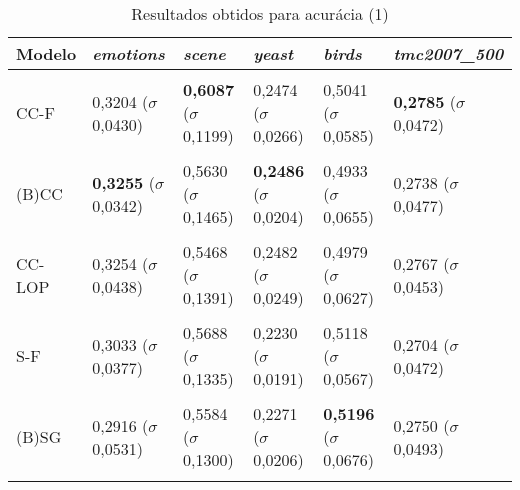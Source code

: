 
\begin{table}[htbp]
	\centering
	\caption{Resultados obtidos para acurácia (1)}
		\begin{tabular}
        { p{0.88in} p{0.88in} p{0.88in} p{0.88in} p{0.88in} p{0.88in} }
        
        \hline
Modelo & \textit{emotions} & \textit{scene} & \textit{yeast} & \textit{birds} & \textit{tmc2007\_500} \\ 
\hline \\

CC-F & 0,3204 \newline ($\sigma$ 0,0430) & \textbf{0,6087} \newline ($\sigma$ 0,1199) & 0,2474 \newline ($\sigma$ 0,0266) & 0,5041 \newline ($\sigma$ 0,0585) & \textbf{0,2785} \newline ($\sigma$ 0,0472) \\ \\
(B)CC & \textbf{0,3255} \newline ($\sigma$ 0,0342) & 0,5630 \newline ($\sigma$ 0,1465) & \textbf{0,2486} \newline ($\sigma$ 0,0204) & 0,4933 \newline ($\sigma$ 0,0655) & 0,2738 \newline ($\sigma$ 0,0477) \\ \\
CC-LOP & 0,3254 \newline ($\sigma$ 0,0438) & 0,5468 \newline ($\sigma$ 0,1391) & 0,2482 \newline ($\sigma$ 0,0249) & 0,4979 \newline ($\sigma$ 0,0627) & 0,2767 \newline ($\sigma$ 0,0453) \\ \\
S-F & 0,3033 \newline ($\sigma$ 0,0377) & 0,5688 \newline ($\sigma$ 0,1335) & 0,2230 \newline ($\sigma$ 0,0191) & 0,5118 \newline ($\sigma$ 0,0567) & 0,2704 \newline ($\sigma$ 0,0472) \\ \\
(B)SG & 0,2916 \newline ($\sigma$ 0,0531) & 0,5584 \newline ($\sigma$ 0,1300) & 0,2271 \newline ($\sigma$ 0,0206) & \textbf{0,5196} \newline ($\sigma$ 0,0676) & 0,2750 \newline ($\sigma$ 0,0493) \\ \\

\end{tabular}
\end{table}
